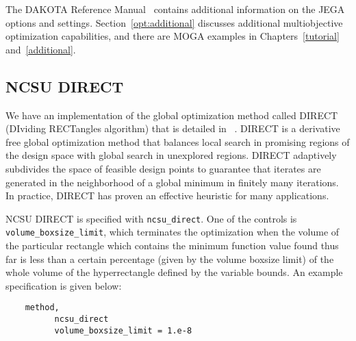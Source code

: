 The DAKOTA Reference Manual~\cite{RefMan} contains additional
information on the JEGA options and settings.
Section~\ref{opt:additional} discusses additional multiobjective
optimization capabilities, and there are MOGA examples in
Chapters~\ref{tutorial} and~\ref{additional}.



\subsection{NCSU DIRECT}\label{opt:software:ncsu}

We have an implementation of the global optimization method called
DIRECT (DIviding RECTangles algorithm) that is detailed in
~\cite{Gab01}. DIRECT is a derivative free global optimization method
that balances local search in promising regions of the design space
with global search in unexplored regions.  DIRECT adaptively
subdivides the space of feasible design points to guarantee that
iterates are generated in the neighborhood of a global minimum in
finitely many iterations.  In practice, DIRECT has proven an effective
heuristic for many applications.

NCSU DIRECT is specified with \texttt{ncsu\_direct}. One of the
controls is \texttt{volume\_boxsize\_limit}, which terminates the
optimization when the volume of the particular rectangle which contains
the minimum function value found thus far
is less than a certain percentage (given by the volume boxsize limit) of
the whole volume of the hyperrectangle defined by the variable bounds.
An example specification is given below:
\begin{small}
\begin{verbatim}
    method,
          ncsu_direct
          volume_boxsize_limit = 1.e-8
\end{verbatim}
\end{small}

